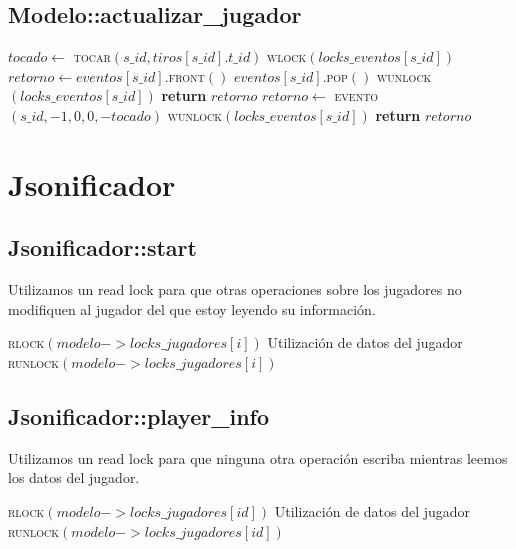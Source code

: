 \documentclass[a4paper,10pt,twoside]{article}
\newenvironment{pseudo}[1][]{%
    \vspace{0.5em}%
    \begin{algorithmic}%
}
{%
    \end{algorithmic}%
    \vspace{0.5em}%
}
\newcommand{\Fn}[2]{\textsc{#1}$(#2)$}
\newcommand{\PReturn}[1]{\textbf{return} $#1$}
\begin{document}
\subsection{Modelo::actualizar\_jugador}

\begin{pseudo}
        \State $tocado \leftarrow$ \Fn{tocar}{s\_id, tiros[s\_id].t\_id}
        \State \Fn{wlock}{locks\_eventos[s\_id]}
        \If{$eventos[s\_id]$.\Fn{size}{} $> 0$}
            \State $retorno \leftarrow eventos[s\_id]$.\Fn{front}{}
            \State $eventos[s\_id]$.\Fn{pop}{}
            \State \Fn{wunlock}{locks\_eventos[s\_id]}
            \State \PReturn{retorno}
        \Else
            \State $retorno \leftarrow$ \Fn{evento}{s\_id, -1, 0, 0, -tocado}
            \State \Fn{wunlock}{locks\_eventos[s\_id]}
            \State \PReturn{retorno}
        \EndIf
    \EndProcedure
\end{pseudo}




\section{Jsonificador}


\subsection{Jsonificador::start}
Utilizamos un read lock para que otras operaciones sobre los jugadores no modifiquen al jugador del que estoy
leyendo su información.
\begin{pseudo}
       \State \Fn{rlock}{modelo->locks\_jugadores[i]}
       \State Utilización de datos del jugador
       \State \Fn{runlock}{modelo->locks\_jugadores[i]}
    \EndFor
\end{pseudo}

\subsection{Jsonificador::player\_info}
Utilizamos un read lock para que ninguna otra operación escriba mientras leemos los datos del jugador.
\begin{pseudo}
    \State \Fn{rlock}{modelo->locks\_jugadores[id]}
    \State Utilización de datos del jugador
    \State \Fn{runlock}{modelo->locks\_jugadores[id]}
\end{pseudo}
\end{document}
